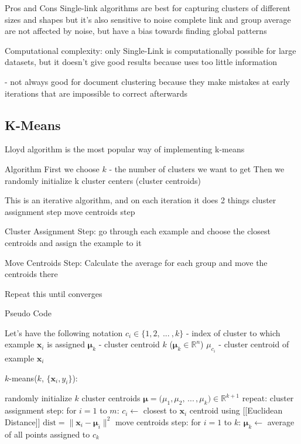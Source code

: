 Pros and Cons
Single-link algorithms are best for capturing clusters of different sizes and shapes
but it's also sensitive to noise
complete link and group average are not affected by noise, but have a bias towards finding global patterns

Computational complexity:
only Single-Link is computationally possible for large datasets, but it doesn't give good results because uses too little information


\cite{steinbach2000comparison} - not always good for document clustering
because they make mistakes at early iterations that are impossible
to correct afterwards


\subsection{K-Means} \label{sec:kmeans}


Lloyd algorithm is the most popular way of implementing k-means


Algorithm 
 First we choose $k$ - the number of clusters we want to get
 Then we randomly initialize k cluster centers (cluster centroids)

This is an iterative algorithm, and on each iteration it does 2 things
 cluster assignment step
 move centroids step

Cluster Assignment Step:
 go through each example and choose the closest centroids
 and assign the example to it

Move Centroids Step:
 Calculate the average for each group
 and move the centroids there

Repeat this until converges


Pseudo Code

Let's have the following notation
$c_i \in \{ 1, 2, \ ... \ , k \}$ - index of cluster to which example $\mathbf x_i$ is assigned
$\boldsymbol \mu_k$ - cluster centroid $k$ ($\boldsymbol \mu_k \in \mathbb{R}^n$)
$\mu_{c_i}$ - cluster centroid of example $\mathbf x_i$

$k$-means($k$, $\{ \mathbf x_i, y_i \}$):

randomly initialize $k$ cluster centroids $\boldsymbol \mu = \Big( \mu_1, \mu_2, \, ... \, , \mu_k \Big) \in \mathbb{R}^{k + 1}$
repeat:
cluster assignment step:
for $i = 1$ to $m$:
$c_i \leftarrow$ closest to $\mathbf x_i$ centroid using [[Euclidean Distance]] $\text{dist} = \| \mathbf x_i - \boldsymbol \mu_i \|^2$
 move centroids step:
 for $i = 1$ to $k$:
 $\boldsymbol \mu_k \leftarrow$ average of all points assigned to $c_k$



